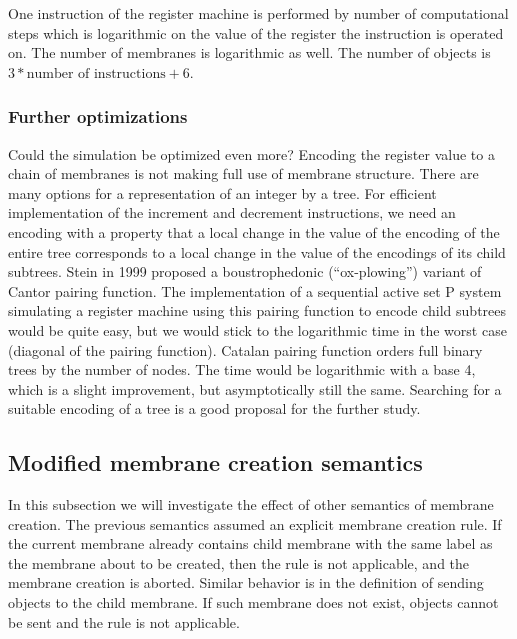     One instruction of the register machine is performed by number of computational steps which is logarithmic on the value of the register the instruction is operated on. The number of membranes is logarithmic as well. The number of objects is $3 * \text{number of instructions} + 6$.

  \subsubsection{Further optimizations} %
  \label{ssub:further_optimizations}
    Could the simulation be optimized even more? Encoding the register value to a chain of membranes is not making full use of membrane structure. There are many options for a representation of an integer by a tree. For efficient implementation of the increment and decrement instructions, we need an encoding with a property that a local change in the value of the encoding of the entire tree corresponds to a local change in the value of the encodings of its child subtrees. Stein in 1999 \cite{Stein99Plowing} proposed a boustrophedonic (``ox-plowing'') variant of Cantor pairing function. The implementation of a sequential active set P system simulating a register machine using this pairing function to encode child subtrees would be quite easy, but we would stick to the logarithmic time in the worst case (diagonal of the pairing function).
    Catalan pairing function \cite{Stanley1986EnumerativeCombinatorics} orders full binary trees by the number of nodes. The time would be logarithmic with a base 4, which is a slight improvement, but asymptotically still the same.
    Searching for a suitable encoding of a tree is a good proposal for the further study.


\subsection{Modified membrane creation semantics} %
\label{sub:modified_membrane_creation_semantics}
  
  In this subsection we will investigate the effect of other semantics of membrane creation. The previous semantics assumed an explicit membrane creation rule. If the current membrane already contains child membrane with the same label as the membrane about to be created, then the rule is not applicable, and the membrane creation is aborted. Similar behavior is in the definition of sending objects to the child membrane. If such membrane does not exist, objects cannot be sent and the rule is not applicable.


